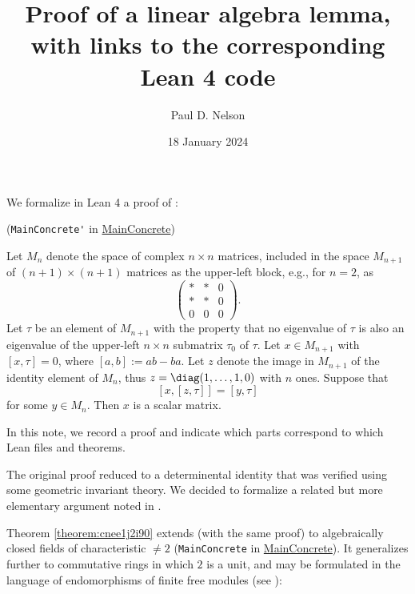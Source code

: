 \documentclass[reqno]{amsart} 
\title{Proof of a linear algebra lemma, with links to the corresponding Lean 4 code}
\author{Paul D. Nelson}
\date{18 January 2024}
\begin{document}
\maketitle

We formalize in Lean 4 a proof of \cite[Theorem 1.8]{2020arXiv201202187N}:

\begin{theorem}\label{theorem:cnee1j2i90}
  (\verb|MainConcrete'| in \href{MainConcrete.lean}{MainConcrete})

  Let $M_{n}$ denote the space of complex $n \times n$ matrices, included in the space $M_{n+1}$ of $(n+1) \times (n+1)$ matrices as the upper-left block, e.g., for $n = 2$, as
  \[
    \begin{pmatrix}
      \ast & \ast & 0 \\
      \ast & \ast & 0 \\
      0 & 0 & 0
    \end{pmatrix}.
  \]
  Let $\tau$ be an element of $M_{n+1}$ with the property that no eigenvalue of $\tau$ is also an eigenvalue of the upper-left $n \times n$ submatrix $\tau_0$ of $\tau$.  Let $x \in M_{n+1}$ with $[x,\tau] = 0$, where $[a,b] := a b -b a$.  Let $z$ denote the image in $M_{n+1}$ of the identity element of $M_n$, thus $z = \diag(1,\dotsc,1,0)$ with $n$ ones.  Suppose that
  \begin{equation}\label{eq:cnee2gzixo}
    [x,[z,\tau]] = [y, \tau]
  \end{equation}
  for some $y \in M_n$.  Then $x$ is a scalar matrix.
\end{theorem}

In this note, we record a proof and indicate which parts correspond to which Lean files and theorems.

\begin{remark}
  The original proof reduced to a determinental identity \cite[Theorem 17.2]{2020arXiv201202187N} that was verified using some geometric invariant theory.  We decided to formalize a related but more elementary argument noted in \cite[Remark 5.15]{2023arXiv2309.06314}.
\end{remark}

Theorem \ref{theorem:cnee1j2i90} extends (with the same proof) to algebraically closed fields of characteristic $\neq 2$ (\verb|MainConcrete| in \href{MainConcrete.lean}{MainConcrete}).  It generalizes further to commutative rings in which $2$ is a unit, and may be formulated in the language of endomorphisms of finite free modules (see \cite[Remark 5.15]{2023arXiv2309.06314}):
\end{document}
